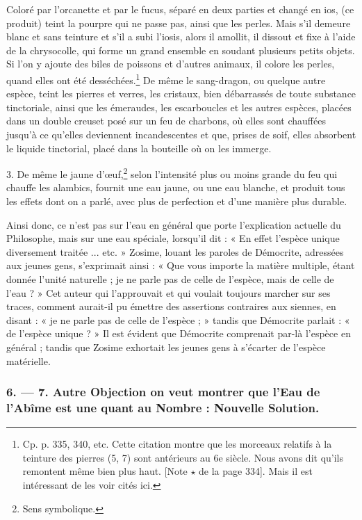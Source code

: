 \documentclass[a4paper, 11pt, oneside, polutonikogreek, french]{article}
\begin{document}
Coloré par l'orcanette et par le fucus, séparé en deux parties et changé en ios, (ce produit) teint la pourpre qui ne passe pas, ainsi que les perles. Mais s'il demeure blanc et sans teinture et s'il a subi l'iosis, alors il amollit, il dissout et fixe à l'aide de la chrysocolle, qui forme un grand ensemble en soudant plusieurs petits objets. Si l'on y ajoute des biles de poissons et d'autres animaux, il colore les perles, quand elles ont été desséchées.\footnote{Cp. p. 335, 340, etc. Cette citation montre que les morceaux relatifs à la teinture des pierres (5, 7) sont antérieurs au 6e siècle. Nous avons dit qu'ils remontent même bien plus haut. [Note $\star$ de la page 334]. Mais il est intéressant de les voir cités ici.} De même le sang-dragon, ou quelque autre espèce, teint les pierres et verres, les cristaux, bien débarrassés de toute substance tinctoriale, ainsi que les émeraudes, les escarboucles et les autres espèces, placées dans un double creuset posé sur un feu de charbons, où elles sont chauffées jusqu'à ce qu'elles deviennent incandescentes et que, prises de soif, elles absorbent le liquide tinctorial, placé dans la bouteille où on les immerge.

3. De même le jaune d'œuf,\footnote{Sens symbolique.} selon l'intensité plus ou moins grande du feu qui chauffe les alambics, fournit une eau jaune, ou une eau blanche, et produit tous les effets dont on a parlé, avec plus de perfection et d'une manière plus durable.

Ainsi donc, ce n'est pas sur l'eau en général que porte l'explication actuelle du Philosophe, mais sur une eau spéciale, lorsqu'il dit : « En effet l'espèce unique diversement traitée ... etc. » Zosime, louant les paroles de Démocrite, adressées aux jeunes gens, s'exprimait ainsi : « Que vous importe la matière multiple, étant donnée l'unité naturelle ; je ne parle pas de celle de l'espèce, mais de celle de l'eau ? » Cet auteur qui l'approuvait et qui voulait toujours marcher sur ses traces, comment aurait-il pu émettre des assertions contraires aux siennes, en disant : « je ne parle pas de celle de l'espèce ; » tandis que Démocrite parlait : « de l'espèce unique ? » Il est évident que Démocrite comprenait par-là l'espèce en général ; tandis que Zosime exhortait les jeunes gens à s'écarter de l'espèce matérielle.

\bigskip
\centerline{\EightStarTaper}
\centerline{\EightStarTaper\EightStarTaper}
\bigskip

\subsubsection{6. --- 7. Autre Objection on veut montrer que l'Eau de l'Abîme est une quant au Nombre : Nouvelle Solution.}
\end{document}
